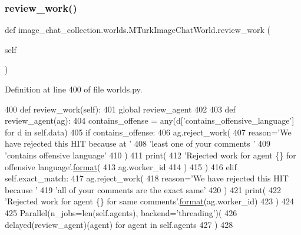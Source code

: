 \subsubsection{\texorpdfstring{review\+\_\+work()}{review\_work()}}
{\footnotesize\ttfamily def image\+\_\+chat\+\_\+collection.\+worlds.\+M\+Turk\+Image\+Chat\+World.\+review\+\_\+work (\begin{DoxyParamCaption}\item[{}]{self }\end{DoxyParamCaption})}



Definition at line 400 of file worlds.\+py.


\begin{DoxyCode}
400     \textcolor{keyword}{def }review\_work(self):
401         \textcolor{keyword}{global} review\_agent
402 
403         \textcolor{keyword}{def }review\_agent(ag):
404             contains\_offense = any(d[\textcolor{stringliteral}{'contains\_offensive\_language'}] \textcolor{keywordflow}{for} d \textcolor{keywordflow}{in} self.data)
405             \textcolor{keywordflow}{if} contains\_offense:
406                 ag.reject\_work(
407                     reason=\textcolor{stringliteral}{'We have rejected this HIT because at '}
408                     \textcolor{stringliteral}{'least one of your comments '}
409                     \textcolor{stringliteral}{'contains offensive language'}
410                 )
411                 print(
412                     \textcolor{stringliteral}{'Rejected work for agent \{\} for offensive language'}.\hyperlink{namespaceparlai_1_1chat__service_1_1services_1_1messenger_1_1shared__utils_a32e2e2022b824fbaf80c747160b52a76}{format}(
413                         ag.worker\_id
414                     )
415                 )
416             \textcolor{keywordflow}{elif} self.exact\_match:
417                 ag.reject\_work(
418                     reason=\textcolor{stringliteral}{'We have rejected this HIT because '}
419                     \textcolor{stringliteral}{'all of your comments are the exact same'}
420                 )
421                 print(
422                     \textcolor{stringliteral}{'Rejected work for agent \{\} for same comments'}.\hyperlink{namespaceparlai_1_1chat__service_1_1services_1_1messenger_1_1shared__utils_a32e2e2022b824fbaf80c747160b52a76}{format}(ag.worker\_id)
423                 )
424 
425         Parallel(n\_jobs=len(self.agents), backend=\textcolor{stringliteral}{'threading'})(
426             delayed(review\_agent)(agent) \textcolor{keywordflow}{for} agent \textcolor{keywordflow}{in} self.agents
427         )
428 
\end{DoxyCode}
\mbox{\label{classimage__chat__collection_1_1worlds_1_1MTurkImageChatWorld_ac4710715dfda617f14c962e641fd16b9}} 
